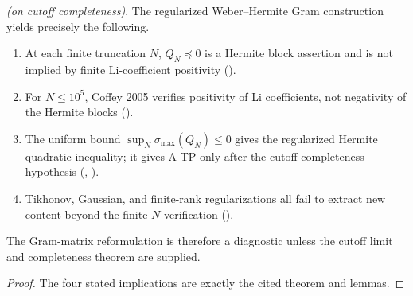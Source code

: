 \begin{theorem}
\label{v4-arith:w7-h:thm:ceiling}
\ClaimStatusProvedHereConditional \emph{(on cutoff completeness)}. The
regularized Weber--Hermite Gram construction yields
precisely the following.
\begin{enumerate}
\item At each finite truncation \(N\), \(Q_{N}\preceq0\) is a Hermite
block assertion and is not implied by finite Li-coefficient positivity
().
\item For \(N\leq 10^{5}\), Coffey 2005 verifies positivity of Li
coefficients, not negativity of the Hermite blocks
().
\item The uniform bound
\(\sup_{N}\sigma_{\max}(Q_{N})\leq0\) gives the regularized Hermite
quadratic inequality; it gives A-TP only after the cutoff
completeness hypothesis
(,
).
\item Tikhonov, Gaussian, and finite-rank regularizations all fail
to extract new content beyond the finite-\(N\) verification
().
\end{enumerate}
The Gram-matrix reformulation is therefore a diagnostic unless the
cutoff limit and completeness theorem are supplied.
\end{theorem}

\begin{proof}
The four stated implications are exactly the cited theorem and
lemmas.
\end{proof}

